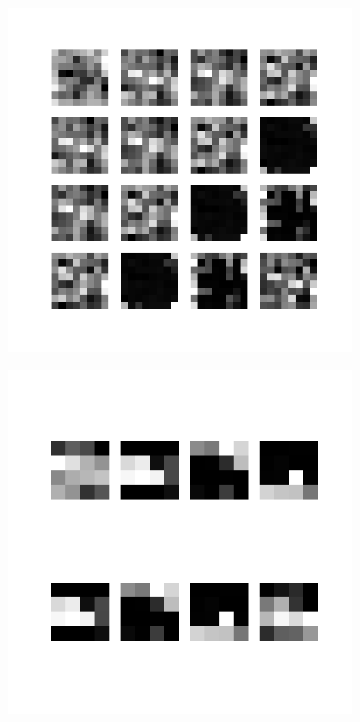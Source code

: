 \begin{figure}
\begin{subfigure}[b]{0.40\linewidth}
    \end{subfigure}
    \\[-0.5cm]
    \begin{subfigure}[b]{0.40\linewidth}
        \includegraphics[width=\linewidth]{images/cae_online_lstm/caelstm_section_cae_training_uniform_random_fill_10000_model_feature_maps_map_0_0_1.png}
    \end{subfigure}
    \hfill
    \begin{subfigure}[b]{0.40\linewidth}
        \includegraphics[width=\linewidth]{images/cae_online_lstm/caelstm_section_cae_training_uniform_random_fill_10000_model_feature_maps_map_0_0_0.png}

\end{subfigure}
\end{figure}
